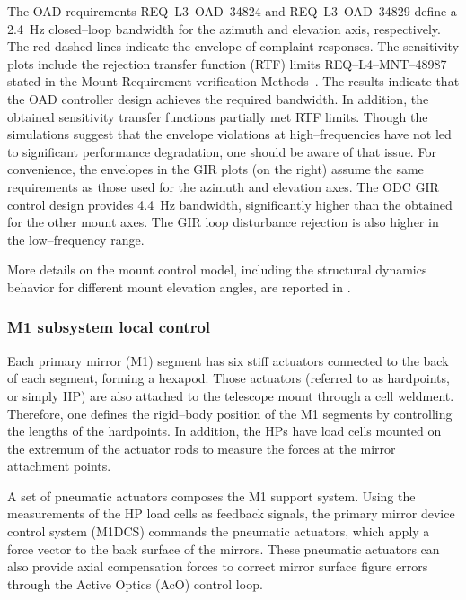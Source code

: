 \documentclass{gmto}
\begin{document}
%
The OAD requirements REQ--L3--OAD--34824 and REQ--L3--OAD--34829 define a \SI{2.4}{Hz} closed--loop bandwidth for the azimuth and elevation axis, respectively. The red dashed lines indicate the envelope of complaint responses. The sensitivity plots include the rejection transfer function (RTF) limits REQ--L4--MNT--48987 stated in the Mount Requirement verification Methods~\cite[Section 5.6.1]{GMT.DOC.02011}. The results indicate that the OAD controller design achieves the required bandwidth. In addition, the obtained sensitivity transfer functions partially met RTF limits. Though the simulations suggest that the envelope violations at high--frequencies have not led to significant performance degradation, one should be aware of that issue. For convenience, the envelopes in the GIR plots (on the right) assume the same requirements as those used for the azimuth and elevation axes. The ODC GIR control design provides \SI{4.4}{Hz} bandwidth, significantly higher than the obtained for the other mount axes. The GIR loop disturbance rejection is also higher in the low--frequency range.

More details on the mount control model, including the structural dynamics behavior for different mount elevation angles, are reported in \cite[Section 3]{ODC_end2end_2021}.


\subsubsection{M1 subsystem local control}
\label{sec:m1-ctrl}

Each primary mirror (M1) segment has six stiff actuators connected to the back of each segment, forming a hexapod. Those actuators (referred to as hardpoints, or simply HP) are also attached to the telescope mount through a cell weldment. Therefore, one defines the rigid--body position of the M1 segments by controlling the lengths of the hardpoints. In addition, the HPs have load cells mounted on the extremum of the actuator rods to measure the forces at the mirror attachment points.


A set of pneumatic actuators composes the M1 support system. Using the measurements of the HP load cells as feedback signals, the primary mirror device control system (M1DCS) commands the pneumatic actuators, which apply a force vector to the back surface of the mirrors. These pneumatic actuators can also provide axial compensation forces to correct mirror surface figure errors through the Active Optics (AcO) control loop.
\end{document}
